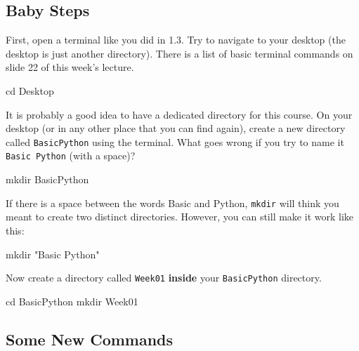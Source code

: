 \subsection{Baby Steps}

First, open a terminal like you did in 1.3. Try to navigate to your desktop (the desktop is just another directory). There is a list of basic terminal commands on slide 22 of this week's lecture.

\vspace{1em}

\begin{solution}
    \begin{outputcode}
cd Desktop
    \end{outputcode}
\end{solution}

\noindent It is probably a good idea to have a dedicated directory for this course. On your desktop (or in any other place that you can find again), create a new directory called \texttt{BasicPython} using the terminal. What goes wrong if you try to name it \texttt{Basic Python} (with a space)?

\vspace{1em}
\begin{solution}
    \begin{outputcode}
mkdir BasicPython
    \end{outputcode}

    \noindent If there is a space between the words Basic and Python, \texttt{mkdir} will think you meant to create two distinct directories. However, you can still make it work like this:

    \begin{outputcode}
mkdir "Basic Python"
    \end{outputcode}

\end{solution}

\noindent Now create a directory called \texttt{Week01} \textbf{inside} your \texttt{BasicPython} directory.

\vspace{1em}

\begin{solution}
    \begin{outputcode}
cd BasicPython
mkdir Week01
    \end{outputcode}
\end{solution}

\subsection{Some New Commands}

